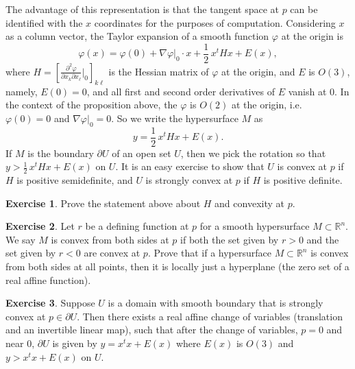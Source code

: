 \documentclass[12pt,openany]{book}
\newcommand{\R}{{\mathbb{R}}}
\theoremstyle{plain}
\theoremstyle{remark}
\theoremstyle{definition}
\newenvironment{exbox}{%
    \def\FrameCommand{\vrule width 1pt \relax\hspace{10pt}}%
    \MakeFramed{\advance\hsize-\width\FrameRestore}%
}{%
    \endMakeFramed
}
\theoremstyle{exercise}
\newtheorem{exercise}{Exercise}[section]
\theoremstyle{example}
\begin{document}
The advantage of this representation is that the tangent space at $p$
can be identified with the $x$ coordinates for the purposes of computation.
Considering $x$ as a column vector, the Taylor expansion of a smooth function $\varphi$ at the origin is
\begin{equation*}
\varphi(x) = \varphi(0) + \nabla \varphi|_0 \cdot x + \frac{1}{2}\, x^t H x + E(x) ,
\end{equation*}
where $H = \left[
\frac{\partial^2 \varphi}{\partial x_k \partial x_\ell} \big|_{0} \right]_{k\ell}$
is the Hessian matrix of $\varphi$ at the origin,
and $E$ is $O(3)$, namely, $E(0) = 0$, and
all first and second order derivatives of $E$ vanish at $0$.
In the context of the proposition above,
the $\varphi$ is $O(2)$ at the origin, i.e.\ $\varphi(0) = 0$
and $\nabla \varphi|_0 = 0$.  So we write the hypersurface
$M$ as
\begin{equation*}
y = \frac{1}{2}\, x^t H x + E(x) .
\end{equation*}
If $M$ is the boundary
$\partial U$ of an open set $U$, then
we pick the rotation so that $y > \frac{1}{2}\,x^t H x + E(x)$ on $U$.
It is an easy exercise to show that $U$ is convex at $p$ if
$H$ is positive semidefinite, and $U$ is strongly convex at $p$ if $H$ is positive definite.

\begin{exbox}
\begin{exercise}
Prove the statement above about $H$ and convexity at $p$.
\end{exercise}

\begin{exercise}
Let $r$ be a defining function at $p$ for a smooth hypersurface
$M \subset \R^n$.
We say $M$ is convex from both sides at $p$ if both the set given by
$r > 0$ and the set given by $r < 0$ are convex at $p$.
Prove that if a hypersurface $M \subset \R^n$ is convex from both sides at all
points, then it is locally just a hyperplane (the zero set of a real affine
function).
\end{exercise}

\begin{exercise}
Suppose $U$ is a domain with smooth boundary that is strongly convex
at $p \in \partial U$.
Then there exists a real affine change of variables (translation and an
invertible linear map), such that after the change of variables, $p=0$ and near $0$, $\partial U$ is given by
$y = x^t x + E(x)$ where $E(x)$ is $O(3)$ and
$y > x^tx + E(x)$ on $U$.
\end{exercise}
\end{exbox}
\end{document}
